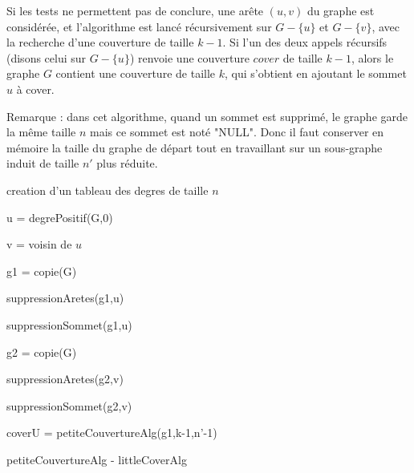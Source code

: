 \documentclass[a4paper,10pt]{article}
\begin{document}
\bigskip

Si les tests ne permettent pas de conclure, une arête $(u,v)$ du graphe est considérée, et l'algorithme est lancé récursivement sur $G - \{u\}$ et $G - \{v\}$, avec la recherche d'une couverture de taille $k-1$. Si l'un des deux appels récursifs (disons celui sur $G - \{u\}$) renvoie une couverture $cover$ de taille $k-1$, alors le graphe $G$ contient une couverture de taille $k$, qui s'obtient en ajoutant le sommet $u$ à cover.

Remarque : dans cet algorithme, quand un sommet est supprimé, le graphe garde la même taille $n$ mais ce sommet est noté "NULL". Donc il faut conserver en mémoire la taille du graphe de départ tout en travaillant sur un sous-graphe induit de taille $n'$ plus réduite.

\vspace{0.35cm}
\begin{algorithm}[H]

\BlankLine




creation d'un tableau des degres de taille $n$

u = degrePositif(G,0)

v = voisin de $u$

g1 = copie(G)

suppressionAretes(g1,u)

suppressionSommet(g1,u)


g2 = copie(G)

suppressionAretes(g2,v)

suppressionSommet(g2,v)


coverU = petiteCouvertureAlg(g1,k-1,n'-1)




\caption{petiteCouvertureAlg - littleCoverAlg}
\end{algorithm}
\end{document}
